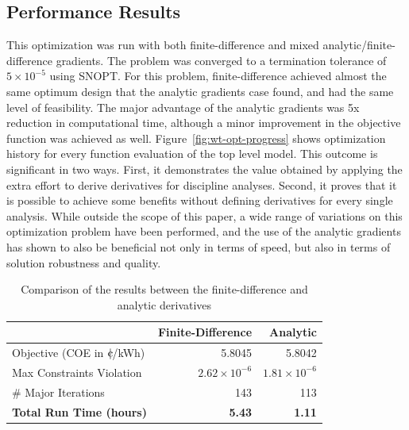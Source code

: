 \documentclass[]{aiaa-tc} %
\newcommand{\cent}{{\mathrm{c}\mkern-6.5mu{\mid}}}
\begin{document}
    \subsection{Performance Results}
        This optimization was run with both finite-difference and mixed analytic/finite-difference gradients.  The problem was converged to a termination tolerance of $5\times10^{-5}$ using SNOPT.  For this problem, finite-difference achieved almost the same optimum design that the analytic gradients case found, and had the same level of feasibility. The major advantage of the analytic gradients was 5x reduction in computational time, although a minor improvement in the objective function was achieved as well. Figure~\ref{fig:wt-opt-progress} shows optimization
        history for every function evaluation of the top level model. This outcome is significant in two ways. First, it demonstrates the value obtained by applying the extra effort to derive derivatives for discipline analyses. Second, it proves that it is possible to achieve some benefits without defining derivatives for every single analysis. While outside the scope of this paper, a wide range of variations on this optimization problem have been performed, and the use of the analytic gradients has shown to also be beneficial not only in terms of speed, but also in terms of solution robustness and quality.



        \begin{table}
            \centering
            \caption{Comparison of the results between the finite-difference and analytic derivatives}
            \begin{tabular}{lrr}
                \toprule
                                                      & Finite-Difference & Analytic \\
                \midrule
                Objective (COE  in $\cent$/kWh)       & 5.8045  & 5.8042 \\ 
                Max Constraints Violation             & $2.62\times10^{-6}$ & $1.81\times10^{-6}$  \\ 
                \# Major Iterations                   &  143 & 113  \\
                \textbf{Total Run Time (hours)}       &  \textbf{5.43} & \textbf{1.11} \\

                \bottomrule
            \end{tabular}
            \label{tab:wt-fd-speeds}
        \end{table}
\end{document}
